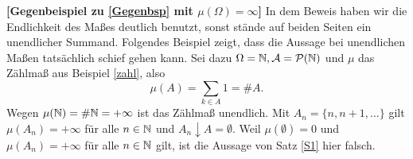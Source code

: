\begin{beispiel}  \textbf{[Gegenbeispiel zu \ref{Gegenbsp} mit $\mu(\Omega) = \infty$] } In dem Beweis haben wir die Endlichkeit des Ma\ss es deutlich benutzt, sonst st\"ande auf beiden Seiten ein unendlicher Summand. Folgendes Beispiel zeigt, dass die Aussage bei unendlichen Ma\ss en tats\"achlich schief gehen kann. 
	Sei dazu $\Omega = \mathbb{N}, \mathcal{A} = \mathcal{P}(\mathbb{N})$ und $\mu$ das Z\"ahlma\ss{} aus Beispiel \ref{zahl}, also
	\[ \mu (A) = \sum\limits_{k \in A} 1=\# A. \] 
Wegen $\mu(\mathbb{N})=\# \mathbb{N}=+\infty$ ist das Z\"ahlma\ss{} unendlich. Mit $A_n=\{ n, n+1, ... \}$ gilt $\mu(A_n)=+\infty$ f\"ur alle $n\in\mathbb{N}$ und $A_n\downarrow A=\emptyset$. Weil $\mu(\emptyset)=0$ und $\mu(A_n)=+\infty$ f\"ur alle $n\in\mathbb{N}$ gilt, ist die Aussage von Satz \ref{S1} hier falsch.	
\end{beispiel}

